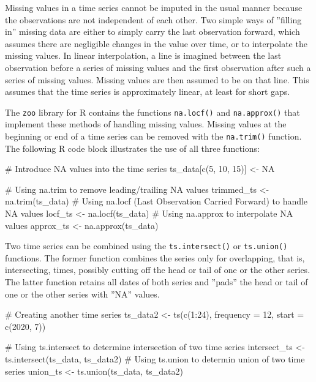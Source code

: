 Missing values in a time series cannot be imputed in the usual manner because the observations are not independent of each other. Two simple ways of ''filling in'' missing data are either to simply carry the last observation forward, which assumes there are negligible changes in the value over time, or to interpolate the missing values. In linear interpolation, a line is imagined between the last observation before a series of missing values and the first observation after such a series of missing values. Missing values are then assumed to be on that line. This assumes that the time series is approximately linear, at least for short gaps. 

The \texttt{zoo} library for R contains the functions \texttt{na.locf()} and \texttt{na.approx()} that implement these methods of handling missing values. Missing values at the beginning or end of a time series can be removed with the \texttt{na.trim()} function. The following R code block illustrates the use of all three functions:

\begin{samepage}
\begin{Rcode}
# Introduce NA values into the time series
ts_data[c(5, 10, 15)] <- NA

# Using na.trim to remove leading/trailing NA values
trimmed_ts <- na.trim(ts_data)
# Using na.locf (Last Observation Carried Forward) to handle NA values
locf_ts <- na.locf(ts_data)
# Using na.approx to interpolate NA values
approx_ts <- na.approx(ts_data)
\end{Rcode}
\end{samepage}

Two time series can be combined using the \texttt{ts.intersect()} or \texttt{ts.union()} functions. The former function combines the series only for overlapping, that is, intersecting, times, possibly cutting off the head or tail of one or the other series. The latter function retains all dates of both series and ''pads'' the head or tail of one or the other series with ''NA'' values. 

\begin{samepage}
\begin{Rcode}
# Creating another time series
ts_data2 <- ts(c(1:24), frequency = 12, start = c(2020, 7))

# Using ts.intersect to determine intersection of two time series
intersect_ts <- ts.intersect(ts_data, ts_data2)
# Using ts.union to determin union of two time series
union_ts <- ts.union(ts_data, ts_data2)
\end{Rcode}
\end{samepage}

